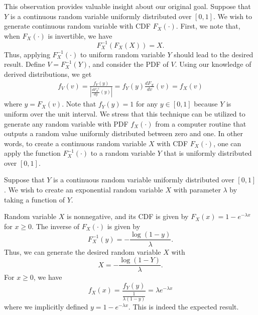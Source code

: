 This observation provides valuable insight about our original goal.
Suppose that $Y$ is a continuous random variable uniformly distributed over $[0,1]$.
We wish to generate continuous random variable with CDF $F_X(\cdot)$.
First, we note that, when $F_X (\cdot)$ is invertible, we have
\begin{equation*}
F_X^{-1} \left( F_X (X) \right) = X .
\end{equation*}
Thus, applying $F_X^{-1} (\cdot)$ to uniform random variable $Y$ should lead to the desired result.
Define $V = F_X^{-1} (Y)$, and consider the PDF of $V$.
Using our knowledge of derived distributions, we get
\begin{equation*}
\begin{split}
f_V (v) = \frac{ f_Y (y) }{ \left| \frac{d F_X^{-1}}{dy} (y) \right| }
= f_Y (y) \frac{d F_X}{dv} (v) = f_X (v)
\end{split}
\end{equation*}
where $y = F_X (v)$.
Note that $f_Y (y) = 1$ for any $y \in [0,1]$ because $Y$ is uniform over the unit interval.
We stress that this technique can be utilized to generate any random variable with PDF $f_X (\cdot)$ from a computer routine that outputs a random value uniformly distributed between zero and one.
In other words, to create a continuous random variable $X$ with CDF $F_X (\cdot)$, one can apply the function $F_X^{-1} (\cdot)$ to a random variable $Y$ that is uniformly distributed over $[0,1]$.

\begin{example}
Suppose that $Y$ is a continuous random variable uniformly distributed over $[0,1]$.
We wish to create an exponential random variable $X$ with parameter $\lambda$ by taking a function of $Y$.

Random variable $X$ is nonnegative, and its CDF is given by $F_X(x) = 1 - e^{- \lambda x}$ for $x \geq 0$.
The inverse of $F_X (\cdot)$ is given by
\begin{equation*}
F_X^{-1} (y) = - \frac{ \log (1 - y) }{\lambda} .
\end{equation*}
Thus, we can generate the desired random variable $X$ with
\begin{equation*}
X = - \frac{ \log (1 - Y) }{\lambda} .
\end{equation*}
For $x \geq 0$, we have
\begin{equation*}
f_X (x) = \frac{ f_Y (y) }{ \frac{1}{\lambda (1 - y)} }
= \lambda e^{- \lambda x}
\end{equation*}
where we implicitly defined $y = 1 - e^{- \lambda x}$.
This is indeed the expected result.
\end{example}


